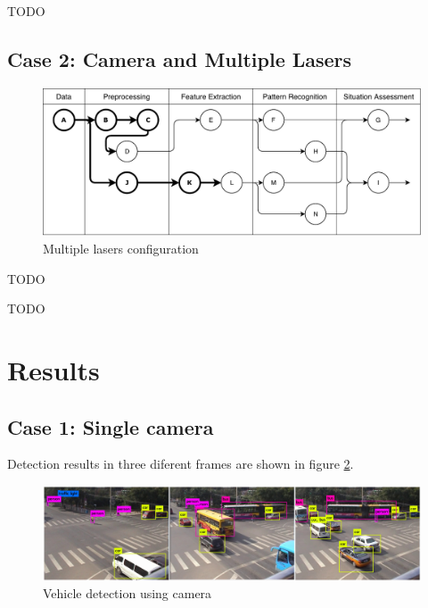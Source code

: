 TODO


\subsection{Case 2: Camera and Multiple Lasers}

\begin{figure}[ht!]
\centering
\includegraphics[scale=0.7]{fig/4/test_configuration2.pdf}
\caption{Multiple lasers configuration}
\label{tconf2}
\end{figure}

TODO

%

TODO

\section{Results}

\subsection{Case 1: Single camera}

Detection results in three diferent frames are shown in figure \ref{camera_detection}.

\begin{figure}[ht!]
\centering
\includegraphics[scale=0.115]{fig/4/camera.jpeg}
\caption{Vehicle detection using camera}
\label{camera_detection}
\end{figure}

